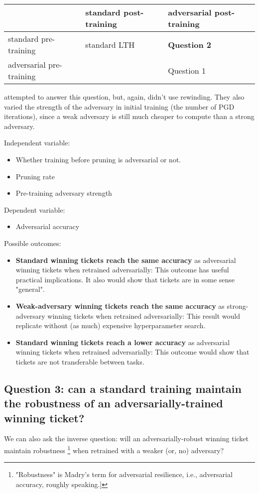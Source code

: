 \documentclass[11pt]{article}
\begin{document}
\begin{center}
\begin{tabular}{lll}
 & standard post-training & adversarial post-training\\
\hline
standard pre-training & standard LTH & \textbf{Question 2}\\
adversarial pre-training &  & Question 1\\
\end{tabular}
\end{center}

\citep{anonymous2020boosting} attempted to answer this question, but, again, didn't use rewinding. They also varied the strength of the
adversary in initial training (the number of PGD iterations), since a weak adversary is still much cheaper to compute than a strong adversary.

Independent variable:
\begin{itemize}
\item Whether training before pruning is adversarial or not.
\item Pruning rate
\item Pre-training adversary strength
\end{itemize}

Dependent variable:
\begin{itemize}
\item Adversarial accuracy
\end{itemize}

Possible outcomes:
\begin{itemize}
\item \textbf{Standard winning tickets reach the same accuracy} as adversarial winning tickets when
retrained adversarially:
This outcome has useful practical implications. It also would show that tickets are in some sense "general".

\item \textbf{Weak-adversary winning tickets reach the same accuracy} as strong-adversary winning tickets when
retrained adversarially:
This result would replicate \citep{anonymous2020boosting} without (as much) expensive hyperparameter search.

\item \textbf{Standard winning tickets reach a lower accuracy} as adversarial winning tickets when
retrained adversarially:
This outcome would show that tickets are not transferable between tasks.
\end{itemize}

\subsection{Question 3: can a standard training maintain the robustness of an adversarially-trained winning ticket?}
\label{sec:orgd4a0873}
We can also ask the inverse question: will an adversarially-robust winning ticket maintain robustness \footnote{"Robustness" is Madry's term for adversarial resilience, i.e., adversarial accuracy, roughly speaking.]} when retrained with a weaker
(or, no) adversary?
\end{document}
